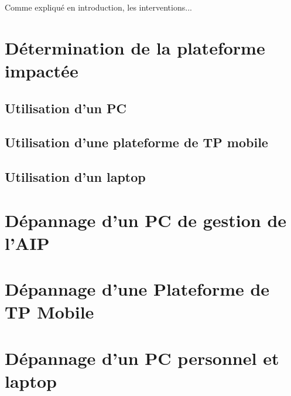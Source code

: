 \documentclass[a4paper]{article}
\begin{document}
Comme expliqué en introduction, les interventions...

\section{Détermination de la plateforme impactée}
%




\subsection{Utilisation d'un PC}
		
\subsection{Utilisation d'une plateforme de TP mobile}

\subsection{Utilisation d'un laptop}
		

\section{Dépannage d'un PC de gestion de l'AIP}

\section{Dépannage d'une Plateforme de TP Mobile}

\section{Dépannage d'un PC personnel et laptop}
\end{document}
